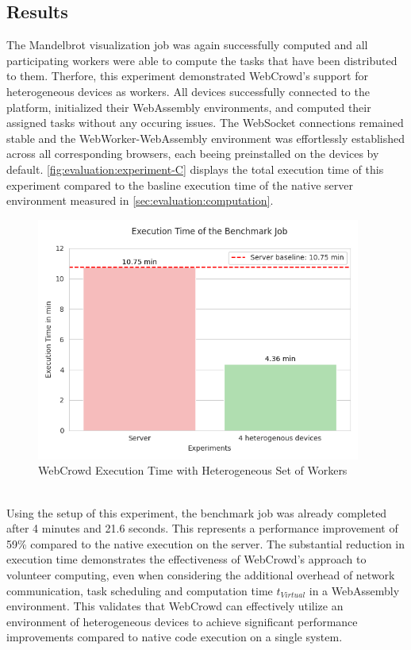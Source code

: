 \subsection{Results}
The Mandelbrot visualization job was again successfully computed and all participating workers were able to compute the tasks that have been distributed to them. Therfore, this experiment demonstrated WebCrowd's support for heterogeneous devices as workers. All devices successfully connected to the platform, initialized their WebAssembly environments, and computed their assigned tasks without any occuring issues. The WebSocket connections remained stable and the WebWorker-WebAssembly environment was effortlessly established across all corresponding browsers, each beeing preinstalled on the devices by default. \autoref{fig:evaluation:experiment-C} displays the total execution time of this experiment compared to the basline execution time of the native server environment measured in \autoref{sec:evaluation:computation}.
\begin{figure}[htbp]
    \centering
    \includegraphics[width=0.95\textwidth]{gfx/figures/Evaluation_C.png}
    \caption{WebCrowd Execution Time with Heterogeneous Set of Workers}
    \label{fig:evaluation:experiment-C}
\end{figure}
~\\
Using the setup of this experiment, the benchmark job was already completed after 4 minutes and 21.6 seconds. This represents a performance improvement of 59\% compared to the native execution on the server. The substantial reduction in execution time demonstrates the effectiveness of WebCrowd's approach to volunteer computing, even when considering the additional overhead of network communication, task scheduling and computation time $t_{Virtual}$ in a WebAssembly environment. This validates that WebCrowd can effectively utilize an environment of heterogeneous devices to achieve significant performance improvements compared to native code execution on a  single system.
